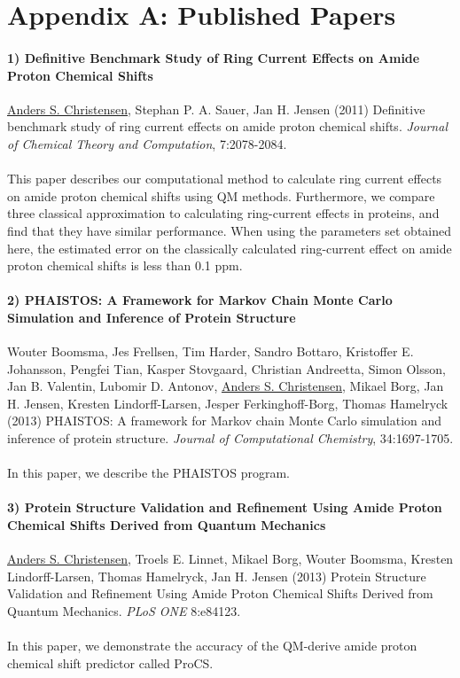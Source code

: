 \chapter{Appendix A: Published Papers}

\subsubsection{1) Definitive Benchmark Study of Ring Current Effects on Amide Proton Chemical Shifts}
\underline{Anders S. Christensen}, Stephan P. A. Sauer, Jan H. Jensen (2011) Definitive benchmark study of ring current effects on amide proton chemical shifts. \textit{Journal of Chemical Theory and Computation}, 7:2078-2084.
\\\\ This paper describes our computational method to calculate ring current effects on amide proton chemical shifts using QM methods.
Furthermore, we compare three classical approximation to calculating ring-current effects in proteins, and find that they have similar performance.
When using the parameters set obtained here, the estimated error on the classically calculated ring-current effect on amide proton chemical shifts is less than 0.1 ppm.

\subsubsection{2) PHAISTOS: A Framework for Markov Chain Monte Carlo Simulation and Inference of Protein Structure}
Wouter Boomsma, Jes Frellsen, Tim Harder, Sandro Bottaro, Kristoffer E. Johansson, Pengfei Tian, Kasper Stovgaard, Christian Andreetta, Simon Olsson, Jan B. Valentin, Lubomir D. Antonov, \underline{Anders S. Christensen}, Mikael Borg, Jan H. Jensen, Kresten Lindorff-Larsen, Jesper Ferkinghoff-Borg, Thomas Hamelryck (2013) PHAISTOS: A framework for Markov chain Monte Carlo simulation and inference of protein structure. \textit{Journal of Computational Chemistry}, 34:1697-1705.
\\\\ In this paper, we describe the PHAISTOS program.

\subsubsection{3) Protein Structure Validation and Refinement Using Amide Proton Chemical Shifts Derived from Quantum Mechanics}
\underline{Anders S. Christensen}, Troels E. Linnet, Mikael Borg, Wouter Boomsma, Kresten Lindorff-Larsen, Thomas Hamelryck, Jan H. Jensen (2013)  Protein Structure Validation and Refinement Using Amide Proton Chemical Shifts Derived from Quantum Mechanics. \textit{PLoS ONE} 8:e84123.
\\\\ In this paper, we demonstrate the accuracy of the QM-derive amide proton chemical shift predictor called ProCS.

